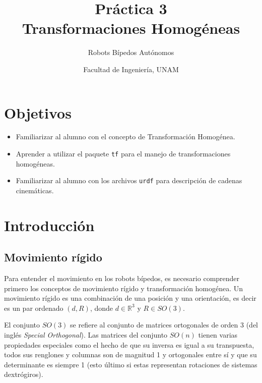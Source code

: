 \documentclass[letterpaper,12pt]{article}
\title{Práctica 3 \\ Transformaciones Homogéneas}
\author{Robots Bípedos Autónomos}
\date{Facultad de Ingeniería, UNAM}
\begin{document}
\renewcommand{\tablename}{Tabla}
\maketitle
\section*{Objetivos}
\begin{itemize}
\item Familiarizar al alumno con el concepto de Transformación Homogénea.
\item Aprender a utilizar el paquete \texttt{tf} para el manejo de transformaciones homogéneas.
\item Familiarizar al alumno con los archivos \texttt{urdf} para descripción de cadenas cinemáticas.
\end{itemize}

\section{Introducción}
\subsection{Movimiento rígido}
Para entender el movimiento en los robots bípedos, es necesario comprender primero los conceptos de movimiento rígido y transformación homogénea. Un movimiento rígido es una combinación de una posición y una orientación, es decir es un par ordenado $(d,R)$, donde $d\in \mathbb{R}^3$ y $R\in SO(3)$.

El conjunto $SO(3)$ se refiere al conjunto de matrices ortogonales de orden 3 (del inglés \textit{Special Orthogonal}). Las matrices del conjunto $SO(n)$ tienen varias propiedades especiales como el hecho de que su inversa es igual a su transpuesta, todos sus renglones y columnas son de magnitud 1 y ortogonales entre sí y que su determinante es siempre 1 (esto último si estas representan rotaciones de sistemas dextrógiros).
\end{document}
